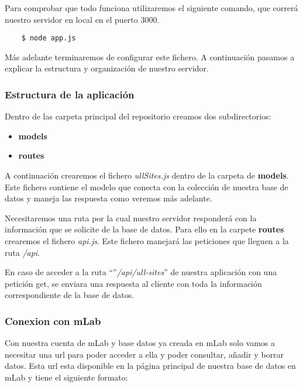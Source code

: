 Para comprobar que todo funciona utilizaremos el siguiente comando, que correrá nuestro servidor en local en el puerto 3000.
\begin{lstlisting}
    $ node app.js
\end{lstlisting}

Más adelante terminaremos de configurar este fichero. A continuación pasamos a explicar la estructura y organización de nuestro servidor.

\subsubsection{Estructura de la aplicación}

Dentro de las carpeta principal del repositorio creamos dos subdirectorios:

\begin{itemize}
    \item \textbf{models}
    \item \textbf{routes}
\end{itemize}


A continuación crearemos el fichero \textit{ullSites.js} dentro de la carpeta de \textbf{models}. Este fichero contiene el modelo que conecta con la colección de nuestra base de datos y maneja las respuesta como veremos más adelante.   


Necesitaremos una ruta por la cual nuestro servidor responderá con la información que se solicite de la base de datos. Para ello en la carpete \textbf{routes} crearemos el fichero \textit{api.js}. Este fichero manejará las peticiones que lleguen a la ruta \textit{/api}. 

 
En caso de acceder a la ruta ``''\textit{/api/ull-sites}'' de nuestra aplicación con una petición get, se enviara una respuesta al cliente con toda la información correspondiente de la base de datos.

\subsubsection{Conexion con mLab}



Con nuestra cuenta de mLab y base datos ya creada en mLab solo vamos a necesitar una url para poder acceder a ella y poder consultar, añadir y borrar datos. Esta url esta disponible en la página principal de nuestra base de datos en mLab y tiene el siguiente formato:

